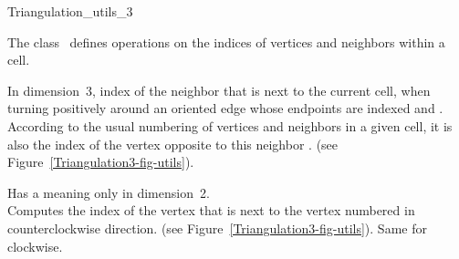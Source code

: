 

\begin{ccRefClass}{Triangulation_utils_3}

\ccDefinition
  
The class \ccRefName\ defines operations on the indices of vertices
and neighbors within a cell.


\ccOperations


{In dimension~3, index of the neighbor  that is next to the current cell,
when turning positively around an oriented edge whose endpoints are
indexed  and . According to the usual numbering of
vertices and neighbors in a given cell, it is also the index of the vertex 
opposite to this neighbor . (see Figure~\ref{Triangulation3-fig-utils}).
}

{Has a meaning only in dimension~2.\\
 Computes the index of the vertex that is next to the vertex numbered
 in counterclockwise direction. (see
Figure~\ref{Triangulation3-fig-utils}).  
}
\ccGlue
{}
{Same for clockwise.}


\end{ccRefClass}
